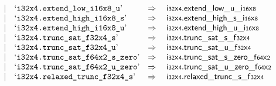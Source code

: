 $$\begin{array}[t]{@{}lrrl@{}l@{}l@{}l@{}}
& & | & \mbox{‘\texttt{i32x4.extend\_low\_i16x8\_u}’} & \quad\Rightarrow\quad{} & {\mathsf{i{\scriptstyle 32}}}{\mathsf{x}}{\mathsf{{\scriptstyle 4}}} {.} {{\mathsf{extend}}{\mathsf{\_}}{\mathsf{low}}{\mathsf{\_}}{\mathsf{u}}}{\mathsf{\_}}{{\mathsf{i{\scriptstyle 16}}}{\mathsf{x}}{\mathsf{{\scriptstyle 8}}}} \\
& & | & \mbox{‘\texttt{i32x4.extend\_high\_i16x8\_s}’} & \quad\Rightarrow\quad{} & {\mathsf{i{\scriptstyle 32}}}{\mathsf{x}}{\mathsf{{\scriptstyle 4}}} {.} {{\mathsf{extend}}{\mathsf{\_}}{\mathsf{high}}{\mathsf{\_}}{\mathsf{s}}}{\mathsf{\_}}{{\mathsf{i{\scriptstyle 16}}}{\mathsf{x}}{\mathsf{{\scriptstyle 8}}}} \\
& & | & \mbox{‘\texttt{i32x4.extend\_high\_i16x8\_u}’} & \quad\Rightarrow\quad{} & {\mathsf{i{\scriptstyle 32}}}{\mathsf{x}}{\mathsf{{\scriptstyle 4}}} {.} {{\mathsf{extend}}{\mathsf{\_}}{\mathsf{high}}{\mathsf{\_}}{\mathsf{u}}}{\mathsf{\_}}{{\mathsf{i{\scriptstyle 16}}}{\mathsf{x}}{\mathsf{{\scriptstyle 8}}}} \\
& & | & \mbox{‘\texttt{i32x4.trunc\_sat\_f32x4\_s}’} & \quad\Rightarrow\quad{} & {\mathsf{i{\scriptstyle 32}}}{\mathsf{x}}{\mathsf{{\scriptstyle 4}}} {.} {{\mathsf{trunc\_sat}}{\mathsf{\_}}{\mathsf{s}}}{\mathsf{\_}}{{\mathsf{f{\scriptstyle 32}}}{\mathsf{x}}{\mathsf{{\scriptstyle 4}}}} \\
& & | & \mbox{‘\texttt{i32x4.trunc\_sat\_f32x4\_u}’} & \quad\Rightarrow\quad{} & {\mathsf{i{\scriptstyle 32}}}{\mathsf{x}}{\mathsf{{\scriptstyle 4}}} {.} {{\mathsf{trunc\_sat}}{\mathsf{\_}}{\mathsf{u}}}{\mathsf{\_}}{{\mathsf{f{\scriptstyle 32}}}{\mathsf{x}}{\mathsf{{\scriptstyle 4}}}} \\
& & | & \mbox{‘\texttt{i32x4.trunc\_sat\_f64x2\_s\_zero}’} & \quad\Rightarrow\quad{} & {\mathsf{i{\scriptstyle 32}}}{\mathsf{x}}{\mathsf{{\scriptstyle 4}}} {.} {{\mathsf{trunc\_sat}}{\mathsf{\_}}{\mathsf{s}}{\mathsf{\_}}{\mathsf{zero}}}{\mathsf{\_}}{{\mathsf{f{\scriptstyle 64}}}{\mathsf{x}}{\mathsf{{\scriptstyle 2}}}} \\
& & | & \mbox{‘\texttt{i32x4.trunc\_sat\_f64x2\_u\_zero}’} & \quad\Rightarrow\quad{} & {\mathsf{i{\scriptstyle 32}}}{\mathsf{x}}{\mathsf{{\scriptstyle 4}}} {.} {{\mathsf{trunc\_sat}}{\mathsf{\_}}{\mathsf{u}}{\mathsf{\_}}{\mathsf{zero}}}{\mathsf{\_}}{{\mathsf{f{\scriptstyle 64}}}{\mathsf{x}}{\mathsf{{\scriptstyle 2}}}} \\
& & | & \mbox{‘\texttt{i32x4.relaxed\_trunc\_f32x4\_s}’} & \quad\Rightarrow\quad{} & {\mathsf{i{\scriptstyle 32}}}{\mathsf{x}}{\mathsf{{\scriptstyle 4}}} {.} {{\mathsf{relaxed\_trunc}}{\mathsf{\_}}{\mathsf{s}}}{\mathsf{\_}}{{\mathsf{f{\scriptstyle 32}}}{\mathsf{x}}{\mathsf{{\scriptstyle 4}}}} \\

\end{array}$$
